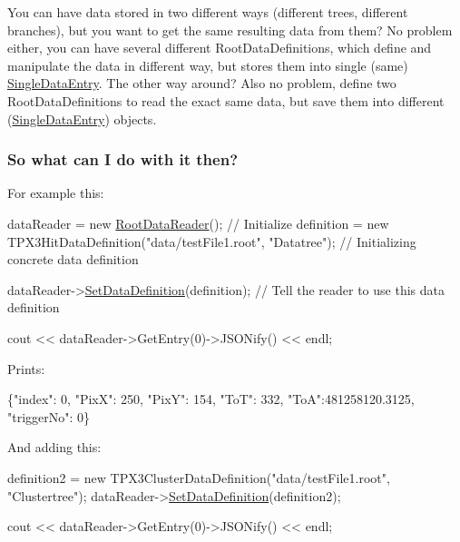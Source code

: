 \begin{DoxyItemize}
You can have data stored in two different ways (different trees, different branches), but you want to get the same resulting data from them? No problem either, you can have several different Root\+Data\+Definitions, which define and manipulate the data in different way, but stores them into single (same) \hyperlink{classSingleDataEntry}{Single\+Data\+Entry}. The other way around? Also no problem, define two Root\+Data\+Definitions to read the exact same data, but save them into different (\hyperlink{classSingleDataEntry}{Single\+Data\+Entry}) objects.
\end{DoxyItemize}

\subsubsection*{So what can I do with it then?}

For example this\+:


\begin{DoxyCode}
dataReader = \textcolor{keyword}{new} \hyperlink{classRootDataReader}{RootDataReader}();      \textcolor{comment}{// Initialize}
definition = \textcolor{keyword}{new} TPX3HitDataDefinition(\textcolor{stringliteral}{"data/testFile1.root"}, \textcolor{stringliteral}{"Datatree"});  \textcolor{comment}{// Initializing concrete data
       definition}

dataReader->\hyperlink{classRootDataReader_ad670745df69f90ea6578d7c29cab716f}{SetDataDefinition}(definition);  \textcolor{comment}{// Tell the reader to use this data definition}

cout << dataReader->GetEntry(0)->JSONify() << endl;
\end{DoxyCode}


Prints\+:


\begin{DoxyCode}
\{\textcolor{stringliteral}{"index"}: 0, \textcolor{stringliteral}{"PixX"}: 250, \textcolor{stringliteral}{"PixY"}: 154, \textcolor{stringliteral}{"ToT"}: 332, \textcolor{stringliteral}{"ToA"}:481258120.3125, \textcolor{stringliteral}{"triggerNo"}: 0\}
\end{DoxyCode}


And adding this\+:


\begin{DoxyCode}
definition2 = \textcolor{keyword}{new} TPX3ClusterDataDefinition(\textcolor{stringliteral}{"data/testFile1.root"}, \textcolor{stringliteral}{"Clustertree"});
dataReader->\hyperlink{classRootDataReader_ad670745df69f90ea6578d7c29cab716f}{SetDataDefinition}(definition2);

cout << dataReader->GetEntry(0)->JSONify() << endl;
\end{DoxyCode}


